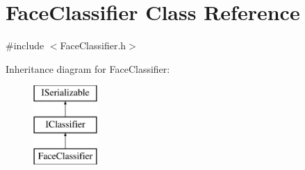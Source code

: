 \hypertarget{class_face_classifier}{}\section{Face\+Classifier Class Reference}
\label{class_face_classifier}


{\ttfamily \#include $<$Face\+Classifier.\+h$>$}

Inheritance diagram for Face\+Classifier\+:\begin{figure}[H]
\begin{center}
\leavevmode
\includegraphics[height=3.000000cm]{class_face_classifier}
\end{center}
\end{figure}

